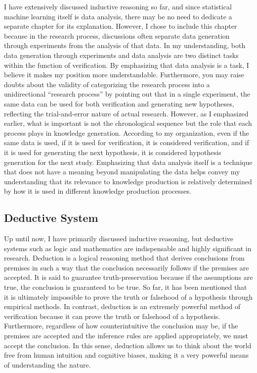 \documentclass{book}
\begin{document}
I have extensively discussed inductive reasoning so far, and since statistical machine learning itself is data analysis, there may be no need to dedicate a separate chapter for its explanation. However, I chose to include this chapter because in the research process, discussions often separate data generation through experiments from the analysis of that data. In my understanding, both data generation through experiments and data analysis are two distinct tasks within the function of verification. By emphasizing that data analysis is a task, I believe it makes my position more understandable. Furthermore, you may raise doubts about the validity of categorizing the research process into a unidirectional ``research process'' by pointing out that in a single experiment, the same data can be used for both verification and generating new hypotheses, reflecting the trial-and-error nature of actual research. However, as I emphasized earlier, what is important is not the chronological sequence but the role that each process plays in knowledge generation. According to my organization, even if the same data is used, if it is used for verification, it is considered verification, and if it is used for generating the next hypothesis, it is considered hypothesis generation for the next study. Emphasizing that data analysis itself is a technique that does not have a meaning beyond manipulating the data helps convey my understanding that its relevance to knowledge production is relatively determined by how it is used in different knowledge production processes.

\subsection{Deductive System}
Up until now, I have primarily discussed inductive reasoning, but deductive systems such as logic and mathematics are indispensable and highly significant in research. Deduction is a logical reasoning method that derives conclusions from premises in such a way that the conclusion necessarily follows if the premises are accepted. It is said to guarantee truth-preservation because if the assumptions are true, the conclusion is guaranteed to be true. So far, it has been mentioned that it is ultimately impossible to prove the truth or falsehood of a hypothesis through empirical methods. In contrast, deduction is an extremely powerful method of verification because it can prove the truth or falsehood of a hypothesis. Furthermore, regardless of how counterintuitive the conclusion may be, if the premises are accepted and the inference rules are applied appropriately, we must accept the conclusion. In this sense, deduction allows us to think about the world free from human intuition and cognitive biases, making it a very powerful means of understanding the nature.
\end{document}
